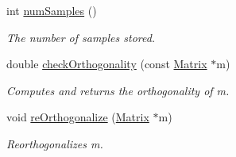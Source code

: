 \begin{DoxyCompactItemize}
int \hyperlink{class_c_a_r_o_m_1_1_incremental_s_v_d_a990854bd1eae209a722160647b362109}{num\-Samples} ()
\begin{DoxyCompactList}\small\item\em The number of samples stored. \end{DoxyCompactList}\item 
double \hyperlink{class_c_a_r_o_m_1_1_incremental_s_v_d_a15ff15297ab54cbffb44a86d83655d70}{check\-Orthogonality} (const \hyperlink{class_c_a_r_o_m_1_1_matrix}{Matrix} $\ast$m)
\begin{DoxyCompactList}\small\item\em Computes and returns the orthogonality of m. \end{DoxyCompactList}\item 
void \hyperlink{class_c_a_r_o_m_1_1_incremental_s_v_d_a527589bf79c7ae0636c3bba4a2861b28}{re\-Orthogonalize} (\hyperlink{class_c_a_r_o_m_1_1_matrix}{Matrix} $\ast$m)
\begin{DoxyCompactList}\small\item\em Reorthogonalizes m. \end{DoxyCompactList}\end{DoxyCompactItemize}
